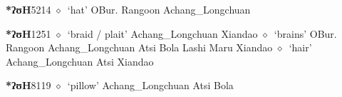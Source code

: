   \begin{list}{}{\leftmargin=1.5em \itemindent=-1.5em}
  \item {\footnotesize \textbf{*ʔʊH}}{\tiny 5214}
         $\diamond$~`hat'
         OBur. 
\hspace{1ex}
         Rangoon 
\hspace{1ex}
         Achang\_Longchuan 
  \item {\footnotesize \textbf{*ʔʊH}}{\tiny 1251}
\hspace{1ex}
         $\diamond$~`braid / plait'
         Achang\_Longchuan 
\hspace{1ex}
         Xiandao 
\hspace{1ex}
         $\diamond$~`brains'
         OBur. 
\hspace{1ex}
         Rangoon 
\hspace{1ex}
         Achang\_Longchuan 
\hspace{1ex}
         Atsi 
\hspace{1ex}
         Bola 
\hspace{1ex}
         Lashi 
\hspace{1ex}
         Maru 
\hspace{1ex}
         Xiandao 
\hspace{1ex}
         $\diamond$~`hair'
         Achang\_Longchuan 
\hspace{1ex}
         Atsi 
\hspace{1ex}
         Xiandao 
  \item {\footnotesize \textbf{*ʔʊH}}{\tiny 8119}
\hspace{1ex}
         $\diamond$~`pillow'
         Achang\_Longchuan 
\hspace{1ex}
         Atsi 
\hspace{1ex}
         Bola 

\end{list}

